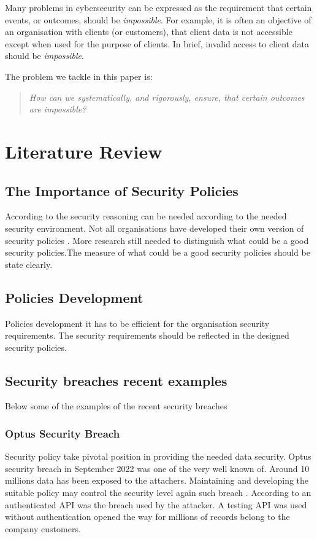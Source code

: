 \documentclass[journal]{IEEEtran}
\begin{document}
Many problems in cybersecurity can be expressed as the requirement that certain
events, or outcomes, should be {\em impossible}.
For example, it is often an objective of an organisation with clients (or
customers), that client data is not accessible except when used for the purpose
of clients. In brief, invalid access to client data should be {\em impossible}.

The problem we tackle in this paper is:
\begin{quote}\em
  How can we systematically, and rigorously, ensure, that
  certain outcomes are impossible?
\end{quote}


\section{Literature Review}

\subsection{The Importance of Security Policies}
According to \cite{glasgow1992logic} the security reasoning can
be needed according to the needed security environment.  Not all
organisations have developed their own version of security policies
\cite{paananen2020state}. More research still needed to distinguish what
could be a good security policies.The measure of what could be a good
security policies should be state clearly.

\subsection{Policies Development}
Policies development it has to be efficient for the organisation security
requirements. The security requirements should be reflected in the
designed security policies.

\subsection{Security breaches recent examples}
Below some of the examples of the recent security breaches

\subsubsection{Optus Security Breach}
Security policy take pivotal position in providing the needed data security.
Optus security breach in September 2022 was one of the very well known of.
Around 10 millions data has been exposed to the attachers. Maintaining
and developing the suitable policy may control the security level
again such breach \cite{biddle2022data}\cite{biddle2022p}.
According to \cite{paul2022}\cite{john2022} an authenticated API was
the breach used by the attacker. A testing API was used without
authentication opened the way for millions of records belong to the company customers.
\end{document}
